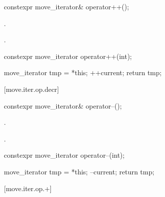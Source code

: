 %
%
\begin{itemdecl}
constexpr move_iterator& operator++();
\end{itemdecl}

\begin{itemdescr}
\pnum
\effects {}.

\pnum
\returns {}.
\end{itemdescr}

%
%
\begin{itemdecl}
constexpr move_iterator operator++(int);
\end{itemdecl}

\begin{itemdescr}
\pnum
\effects
\begin{codeblock}
move_iterator tmp = *this;
++current;
return tmp;
\end{codeblock}
\end{itemdescr}

[move.iter.op.decr]{}

%
%
\begin{itemdecl}
constexpr move_iterator& operator--();
\end{itemdecl}

\begin{itemdescr}
\pnum
\effects {}.

\pnum
\returns {}.
\end{itemdescr}

%
%
\begin{itemdecl}
constexpr move_iterator operator--(int);
\end{itemdecl}

\begin{itemdescr}
\pnum
\effects
\begin{codeblock}
move_iterator tmp = *this;
--current;
return tmp;
\end{codeblock}
\end{itemdescr}

[move.iter.op.+]{}

